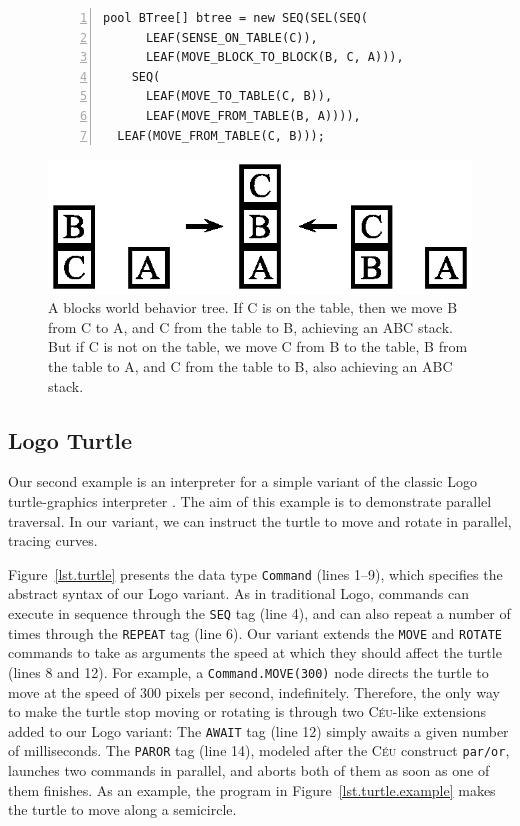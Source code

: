 \documentclass{sig-alternate}
\newcommand{\CEU}{\textsc{C\'{e}u}\xspace}
\newcommand{\code}[1] {{\small{\texttt{#1}}}}
\begin{document}
\begin{figure}[t]
\begin{lstlisting}[numbers=left,xleftmargin=3em]
pool BTree[] btree = new SEQ(SEL(SEQ(
      LEAF(SENSE_ON_TABLE(C)),
      LEAF(MOVE_BLOCK_TO_BLOCK(B, C, A))),
    SEQ(
      LEAF(MOVE_TO_TABLE(C, B)),
      LEAF(MOVE_FROM_TABLE(B, A)))),
  LEAF(MOVE_FROM_TABLE(C, B)));
\end{lstlisting}
\centerline{\includegraphics[scale=0.5]{blocksworld.eps}}
\caption{ A blocks world behavior tree.
If C is on the table,
then we move B from C to A,
and C from the table to B,
achieving an ABC stack.
But if C is not on the table,
we move C from B to the table,
B from the table to A,
and C from the table to B,
also achieving an ABC stack.
\label{lst.bt1.example}
}
\end{figure}

\subsection{Logo Turtle}

Our second example is an interpreter for a simple variant of the classic Logo
turtle-graphics interpreter \cite{papert.logo}.
The aim of this example is to demonstrate parallel traversal.
In our variant, we can instruct the turtle to move and rotate in parallel, 
tracing curves.


Figure~\ref{lst.turtle} presents the data type \code{Command} (lines 1--9), 
which specifies the abstract syntax of our Logo variant.
As in traditional Logo, commands can execute in sequence through the \code{SEQ} 
tag (line 4), and can also repeat a number of times through the \code{REPEAT} 
tag (line 6).
%
Our variant extends the \code{MOVE} and \code{ROTATE} commands to take as 
arguments the speed at which they should affect the turtle (lines 8 and 12).
For example, a \code{Command.MOVE(300)} node directs the turtle to move at the 
speed of 300 pixels per second, indefinitely.
%
Therefore, the only way to make the turtle stop moving or rotating is through 
two \CEU-like extensions added to our Logo variant:
The \code{AWAIT} tag (line 12) simply awaits a given number of milliseconds.
The \code{PAROR} tag (line 14), modeled after the \CEU construct \code{par/or},
launches two commands in parallel, and aborts both of them as soon as one of
them finishes.
%
As an example, the program in Figure~\ref{lst.turtle.example} makes the turtle 
to move along a semicircle.
\end{document}
